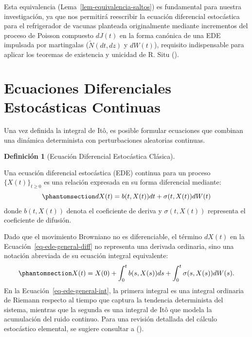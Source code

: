 \documentclass[
  spanish,
  us-letterpaper,
]{scrreprt}
\numberwithin{equation}{section}
\theoremstyle{plain}
\theoremstyle{plain}
\theoremstyle{definition}
\newtheorem{definition}{Definición}[chapter]
\theoremstyle{plain}
\theoremstyle{remark}
\begin{document}
Esta equivalencia (Lema~\ref{lem-equivalencia-saltos}) es fundamental
para nuestra investigación, ya que nos permitirá reescribir la ecuación
diferencial estocástica para el refrigerador de vacunas planteada
originalmente mediante incrementos del proceso de Poisson compuesto
\(dJ(t)\) en la forma canónica de una EDE impulsada por martingalas
(\(\tilde{N}(dt, dz)\) y \(dW(t)\)), requisito indispensable para
aplicar los teoremas de existencia y unicidad de R. Situ
().

\section{Ecuaciones Diferenciales Estocásticas
Continuas}\label{ecuaciones-diferenciales-estocuxe1sticas-continuas}

Una vez definida la integral de Itô, es posible formular ecuaciones que
combinan una dinámica determinista con perturbaciones aleatorias
continuas.

\begin{definition}[Ecuación Diferencial Estocástica
Clásica]\protect\hypertarget{def-ede-general}{}\label{def-ede-general}

Una ecuación diferencial estocástica (EDE) continua para un proceso
\(\{X(t)\}_{t \ge 0}\) es una relación expresada en su forma diferencial
mediante: \begin{equation}\phantomsection\label{eq-ede-general-diff}{
dX(t) = b(t, X(t)) dt + \sigma(t, X(t)) dW(t)
}\end{equation} donde \(b(t, X(t))\) denota el coeficiente de deriva y
\(\sigma(t, X(t))\) representa el coeficiente de difusión.

\end{definition}

Dado que el movimiento Browniano no es diferenciable, el término
\(dX(t)\) en la Ecuación~\ref{eq-ede-general-diff} no representa una
derivada ordinaria, sino una notación abreviada de su ecuación integral
equivalente: \begin{equation}\phantomsection\label{eq-ede-general-int}{
X(t) = X(0) + \int_0^t b(s, X(s)) ds + \int_0^t \sigma(s, X(s)) dW(s).
}\end{equation} En la Ecuación~\ref{eq-ede-general-int}, la primera
integral es una integral ordinaria de Riemann respecto al tiempo que
captura la tendencia determinista del sistema, mientras que la segunda
es una integral de Itô que modela la acumulación del ruido continuo.
Para una revisión detallada del cálculo estocástico elemental, se
sugiere consultar a ().
\end{document}
